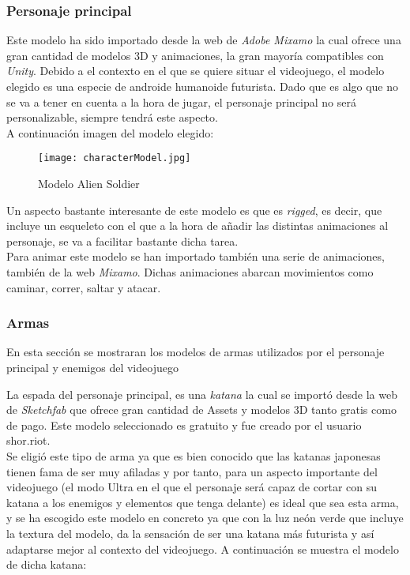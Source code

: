 \subsubsection{Personaje principal}
Este modelo ha sido importado desde la web de \textit{Adobe Mixamo} \cite{Mixamo} la cual ofrece una gran cantidad de modelos 3D
y animaciones, la gran mayoría compatibles con \textit{Unity}. Debido a el contexto en el que se quiere situar
el videojuego, el modelo elegido es una especie de androide humanoide futurista. Dado que es algo que no se va a tener en cuenta a la hora de
jugar, el personaje principal no será personalizable, siempre tendrá este aspecto. \\
A continuación imagen del modelo elegido: 

\begin{figure}[htbp]
\centering
\texttt{[image: characterModel.jpg]}
\caption{Modelo Alien Soldier}
\end{figure}

Un aspecto bastante interesante de este modelo es que es \textit{rigged}, es decir, que incluye
un esqueleto con el que a la hora de añadir las distintas animaciones al personaje, se va a facilitar bastante dicha tarea. \\

Para animar este modelo se han importado también una serie de animaciones, también de la web
\textit{Mixamo}. Dichas animaciones abarcan movimientos como caminar, correr, saltar y atacar.

\subsubsection{Armas}
En esta sección se mostraran los modelos de armas utilizados por el personaje principal y enemigos del videojuego

La espada del personaje principal, es una \textit{katana} la cual se importó desde la web de 
\textit{Sketchfab} \cite{Sketchfab} que ofrece gran cantidad de Assets y modelos 3D tanto gratis como de pago.
Este modelo seleccionado es gratuito y fue creado por el usuario shor.riot. \\

Se eligió este tipo de arma ya que es bien conocido
que las katanas japonesas tienen fama de ser muy afiladas y por tanto, para un aspecto importante del videojuego 
(el modo Ultra en el que el personaje será capaz de cortar con su katana a los enemigos y elementos que tenga delante) es ideal que sea esta arma, y se
ha escogido este modelo en concreto ya que con la luz neón verde que incluye la textura del modelo,
da la sensación de ser una katana más futurista y así adaptarse mejor al contexto del videojuego. A continuación se muestra el modelo
de dicha katana: 

